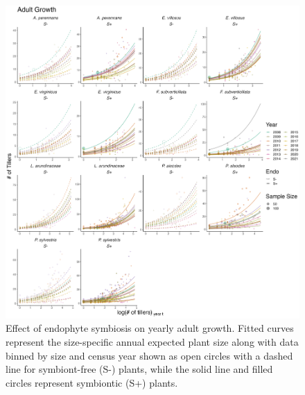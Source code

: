 \documentclass[9pt,twoside,lineno]{pnas-new}
\begin{document}
\begin{figure}
	\centering
	\includegraphics[width=\linewidth]{grow_yearplot.png}
	\caption{Effect of endophyte symbiosis on yearly adult growth. Fitted curves represent the size-specific annual expected plant size along with data binned by size and census year shown as open circles with a dashed line for symbiont-free (S-) plants, while the solid line and filled circles represent symbiontic (S+) plants. }
\end{figure}
\end{document}

